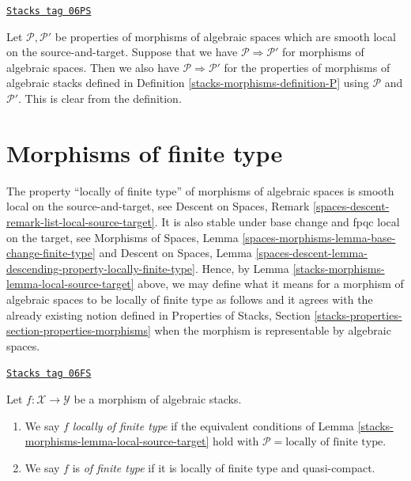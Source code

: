 \begin{remark}[Implication]
\label{stacks-morphisms-remark-implication}
\href{https://stacks.math.columbia.edu/tag/06PS}{\texttt{Stacks tag 06PS}}

Let $\mathcal{P}, \mathcal{P}'$ be properties of morphisms of algebraic spaces
which are smooth local on the source-and-target.
Suppose that we have $\mathcal{P} \Rightarrow \mathcal{P}'$ for morphisms
of algebraic spaces. Then we also have $\mathcal{P} \Rightarrow \mathcal{P}'$
for the properties of morphisms of algebraic stacks defined in
Definition \ref{stacks-morphisms-definition-P}
using $\mathcal{P}$ and $\mathcal{P}'$. This is clear from the definition.
\end{remark}

\section{Morphisms of finite type}
\label{stacks-morphisms-section-finite-type}
The property ``locally of finite type'' of morphisms of algebraic spaces
is smooth local on the source-and-target, see
Descent on Spaces, Remark \ref{spaces-descent-remark-list-local-source-target}.
It is also stable under base change and fpqc local on the target, see
Morphisms of Spaces,
Lemma \ref{spaces-morphisms-lemma-base-change-finite-type}
and
Descent on Spaces,
Lemma \ref{spaces-descent-lemma-descending-property-locally-finite-type}.
Hence, by
Lemma \ref{stacks-morphisms-lemma-local-source-target}
above, we may define what it means for a morphism of algebraic spaces
to be locally of finite type as follows and it agrees with the already
existing notion defined in
Properties of Stacks,
Section \ref{stacks-properties-section-properties-morphisms}
when the morphism is representable by algebraic spaces.

\begin{definition}
\label{stacks-morphisms-definition-locally-finite-type}
\href{https://stacks.math.columbia.edu/tag/06FS}{\texttt{Stacks tag 06FS}}

Let $f : \mathcal{X} \to \mathcal{Y}$ be a morphism of algebraic stacks.
\begin{enumerate}
\item We say $f$
{\it locally of finite type} if the equivalent conditions of
Lemma \ref{stacks-morphisms-lemma-local-source-target}
hold with
$\mathcal{P} = \text{locally of finite type}$.
\item We say $f$ is
{\it of finite type} if it is locally of finite type and quasi-compact.
\end{enumerate}
\end{definition}

